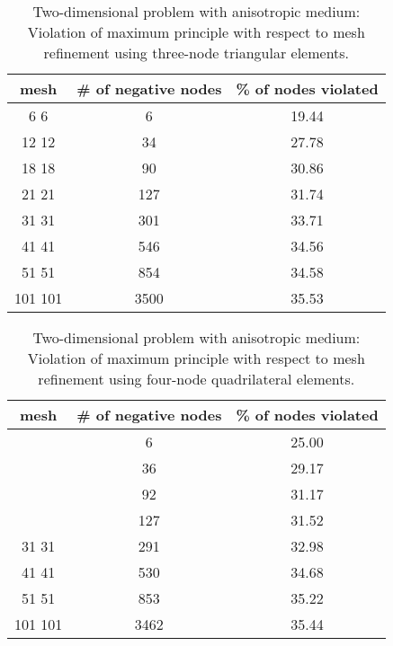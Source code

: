 \documentclass[11pt]{amsart}
\begin{document}
\begin{table}[t]
  \centering
  \caption{Two-dimensional problem with anisotropic medium: Violation of maximum 
    principle with respect to mesh refinement using three-node triangular elements. 
    \label{Table:Decay_square_plate_T3}}
  \begin{tabular}{|c|c|c|} \hline
    \textbf{mesh} & \textbf{\# of negative nodes} & \textbf{\% of nodes violated} \\ \hline
    6  6   & 6 & 19.44                \\ \hline
    12  12  & 34 & 27.78          \\ \hline
    18  18  & 90 & 30.86          \\ \hline
    21  21  & 127 & 31.74        \\ \hline
    31  31  & 301 & 33.71        \\ \hline
    41  41  & 546 & 34.56        \\ \hline
    51  51  & 854 & 34.58        \\ \hline
    101  101 & 3500 & 35.53  \\ \hline
  \end{tabular}
\end{table}

\begin{table}[t]
  \centering
  \caption{Two-dimensional problem with anisotropic medium: Violation of maximum 
    principle with respect to mesh refinement using four-node quadrilateral elements. 
    \label{Table:Decay_square_plate_Q4}}
  \begin{tabular}{|c|c|c|} \hline
    \textbf{mesh} & \textbf{\# of negative nodes} & \textbf{\% of nodes violated} \\ \hline
     & 6 & 25.00                  \\ \hline
      & 36 & 29.17          \\ \hline
     & 92 & 31.17           \\ \hline
     & 127 & 31.52         \\ \hline
    31  31 & 291 & 32.98         \\ \hline
    41  41 & 530 & 34.68         \\ \hline
    51  51 & 853 & 35.22         \\ \hline
    101  101 & 3462 & 35.44  \\ \hline
  \end{tabular}
\end{table}
\end{document}
